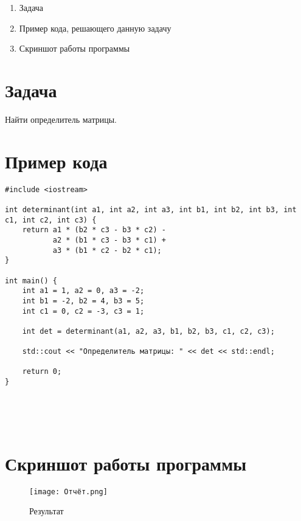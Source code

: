 \documentclass[12pt,a4paper]{scrartcl}
\begin{document}
\begin{enumerate}
	\item Задача
	\item Пример кода, решающего данную задачу
	\item Скриншот работы программы
\end{enumerate}
\section{Задача}
Найти определитель матрицы.
\section{Пример кода}
\label{sec:exp:code}
\begin{verbatim}
#include <iostream>

int determinant(int a1, int a2, int a3, int b1, int b2, int b3, int c1, int c2, int c3) {
    return a1 * (b2 * c3 - b3 * c2) -
           a2 * (b1 * c3 - b3 * c1) +
           a3 * (b1 * c2 - b2 * c1);
}

int main() {
    int a1 = 1, a2 = 0, a3 = -2;
    int b1 = -2, b2 = 4, b3 = 5;
    int c1 = 0, c2 = -3, c3 = 1;

    int det = determinant(a1, a2, a3, b1, b2, b3, c1, c2, c3);

    std::cout << "Определитель матрицы: " << det << std::endl;

    return 0;
}

	
	
	
\end{verbatim}
\vfill

\section{Скриншот работы программы}
\label{sec:picexample}
\begin{figure}[h]
	\centering
	\texttt{[image: Отчёт.png]}
	\caption{Результат}\label{fig:par}
\end{figure}
\end{document}
